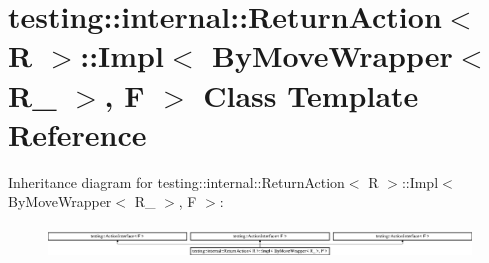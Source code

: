 \hypertarget{classtesting_1_1internal_1_1_return_action_1_1_impl_3_01_by_move_wrapper_3_01_r___01_4_00_01_f_01_4}{}\section{testing\+::internal\+::Return\+Action$<$ R $>$\+::Impl$<$ By\+Move\+Wrapper$<$ R\+\_\+ $>$, F $>$ Class Template Reference}
\label{classtesting_1_1internal_1_1_return_action_1_1_impl_3_01_by_move_wrapper_3_01_r___01_4_00_01_f_01_4}
Inheritance diagram for testing\+::internal\+::Return\+Action$<$ R $>$\+::Impl$<$ By\+Move\+Wrapper$<$ R\+\_\+ $>$, F $>$\+:\begin{figure}[H]
\begin{center}
\leavevmode
\includegraphics[height=0.891010cm]{df/d5e/classtesting_1_1internal_1_1_return_action_1_1_impl_3_01_by_move_wrapper_3_01_r___01_4_00_01_f_01_4}
\end{center}
\end{figure}
